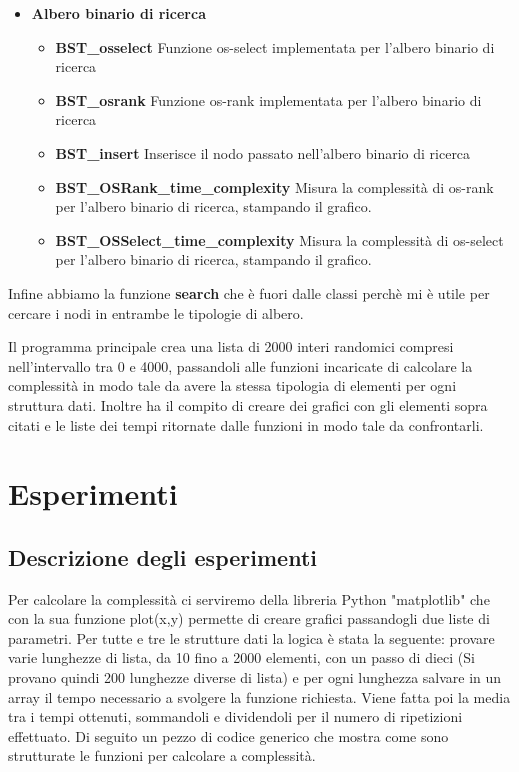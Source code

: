 \begin{itemize}
    \item \textbf{Albero binario di ricerca}
    \begin{itemize}
        \item \textbf{BST\_osselect} Funzione os-select implementata per l'albero binario di ricerca
        \item \textbf{BST\_osrank} Funzione os-rank implementata per l'albero binario di ricerca
        \item \textbf{BST\_insert} Inserisce il nodo passato nell'albero binario di ricerca
        \item \textbf{BST\_OSRank\_time\_complexity}  Misura la complessità di os-rank per l'albero binario di ricerca, stampando il grafico.
        \item \textbf{BST\_OSSelect\_time\_complexity} Misura la complessità di os-select per l'albero binario di ricerca, stampando il grafico.
    \end{itemize}
\end{itemize}

Infine abbiamo la funzione \textbf{search} che è fuori dalle classi perchè mi è utile per cercare i nodi in entrambe le tipologie di albero.

Il programma principale crea una lista di 2000 interi randomici compresi nell'intervallo tra 0 e 4000, passandoli alle funzioni incaricate di calcolare la complessità in modo tale da avere la stessa tipologia di elementi per ogni struttura dati. Inoltre ha il compito di creare dei grafici con gli elementi sopra citati e le liste dei tempi ritornate dalle funzioni in modo tale da confrontarli.


\section{Esperimenti}

\subsection{Descrizione degli esperimenti}
Per calcolare la complessità ci serviremo della libreria Python "matplotlib" che con la sua funzione plot(x,y) permette di creare grafici passandogli due liste di parametri.
Per tutte e tre le strutture dati la logica è stata la seguente: provare varie lunghezze di lista, da 10 fino a 2000 elementi, con un passo di dieci (Si provano quindi 200 lunghezze diverse di lista) e per ogni lunghezza salvare in un array il tempo necessario a svolgere la funzione richiesta. Viene fatta poi la media tra i tempi ottenuti, sommandoli e dividendoli per il numero di ripetizioni effettuato. Di seguito un pezzo di codice generico che mostra come sono strutturate le funzioni per calcolare a complessità.

